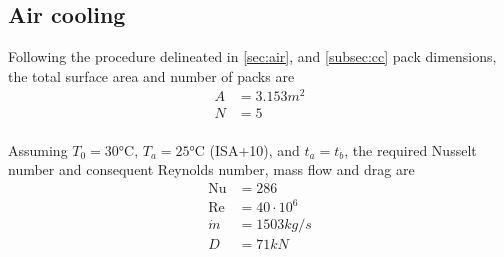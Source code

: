 \subsection{Air cooling}

Following the procedure delineated in \cref{sec:air}, and \cref{subsec:cc} pack dimensions, the total surface area  and number of packs are
\begin{align}
    A &= 3.153\si{m^2} \\
    N &= 5 \\
\end{align}

Assuming $T_0=30\si{\celsius}$, $T_a = 25\si{\celsius}$ (ISA+10), and $t_a=t_b$, the required Nusselt number and consequent Reynolds number, mass flow and drag are
\begin{align}
    \text{Nu} &= 286 \\
    \text{Re} &= 40\cdot10^6 \\
    \dot{m} &= 1503\si{kg/s} \\
    D &= 71\si{kN}
\end{align}
